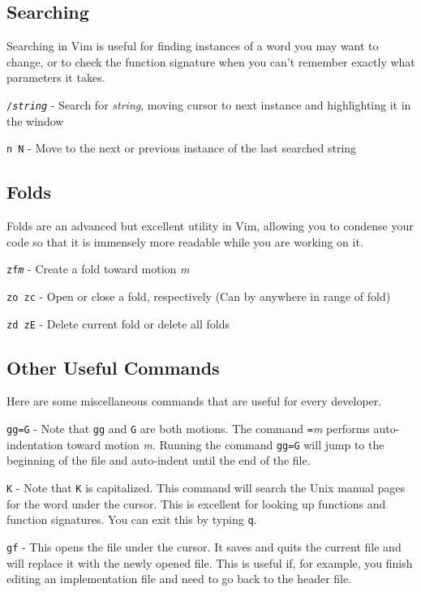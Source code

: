 \documentclass[11pt]{article}
\begin{document}
\subsection*{Searching}
Searching in Vim is useful for finding instances of a word you may want to change, or to check the function signature when you can't remember exactly what parameters it takes.
\begin{description}
	\item{\texttt{/\textit{string}}} - Search for \textit{string}, moving cursor to next instance and highlighting it in the window
	\item{\texttt{n N}} - Move to the next or previous instance of the last searched string
\end{description}
\subsection*{Folds}
Folds are an advanced but excellent utility in Vim, allowing you to condense your code so that it is immensely more readable while you are working on it. 
\begin{description}
	\item{\texttt{zf\textit{m}}} - Create a fold toward motion \textit{m}
	\item{\texttt{zo zc}} - Open or close a fold, respectively (Can by anywhere in range of fold)
	\item{\texttt{zd zE}} - Delete current fold or delete all folds
\end{description}
\subsection*{Other Useful Commands}
Here are some miscellaneous commands that are useful for every developer. 
\begin{description}
	\item{\texttt{gg=G}} - Note that \texttt{gg} and \texttt{G} are both motions. The command \texttt{=}\textit{m} performs auto-indentation toward motion \textit{m}. Running the command \texttt{gg=G} will jump to the beginning of the file and auto-indent until the end of the file.
	\item{\texttt{K}} - Note that \texttt{K} is capitalized. This command will search the Unix manual pages for the word under the cursor. This is excellent for looking up functions and function signatures. You can exit this by typing \texttt{q}.
	\item{\texttt{gf}} - This opens the file under the cursor. It saves and quits the current file and will replace it with the newly opened file. This is useful if, for example, you finish editing an implementation file and need to go back to the header file.
\end{description}
\end{document}
